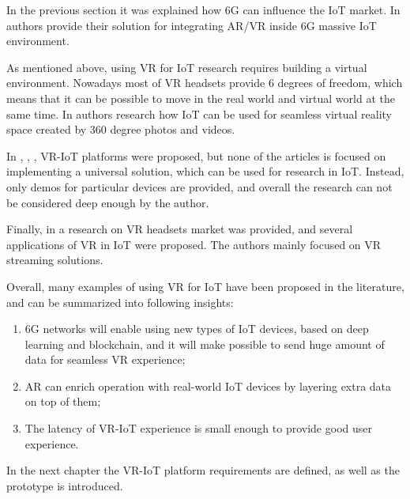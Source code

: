 In the previous section it was explained how 6G can influence the IoT market. In \cite{liao_information-centric_2021} authors provide their solution for integrating AR/VR inside 6G massive IoT environment.

As mentioned above, using VR for IoT research requires building a virtual environment. Nowadays most of VR headsets provide 6 degrees of freedom, which means that it can be possible to move in the real world and virtual world at the same time. In \cite{you_internet_2018} authors research how IoT can be used for seamless virtual reality space created by 360 degree photos and videos.

In \cite{myeong-in_choi_design_2017}, \cite{simiscuka_synchronisation_2018}, \cite{simiscuka_real-virtual_2019}, \cite{krishnan_performance_2020} VR-IoT platforms were proposed, but none of the articles is focused on implementing a universal solution, which can be used for research in IoT. Instead, only demos for particular devices are provided, and overall the research can not be considered deep enough by the author.

Finally, in \cite{hu_virtual_2021} a research on VR headsets market was provided, and several applications of VR in IoT were proposed. The authors mainly focused on VR streaming solutions.

Overall, many examples of using VR for IoT have been proposed in the literature, and can be summarized into following insights:
\begin{enumerate}
    \item 6G networks will enable using new types of IoT devices, based on deep learning and blockchain, and it will make possible to send huge amount of data for seamless VR experience;
    \item AR can enrich operation with real-world IoT devices by layering extra data on top of them;
    \item The latency of VR-IoT experience is small enough to provide good user experience.
\end{enumerate}

In the next chapter the VR-IoT platform requirements are defined, as well as the prototype is introduced.
